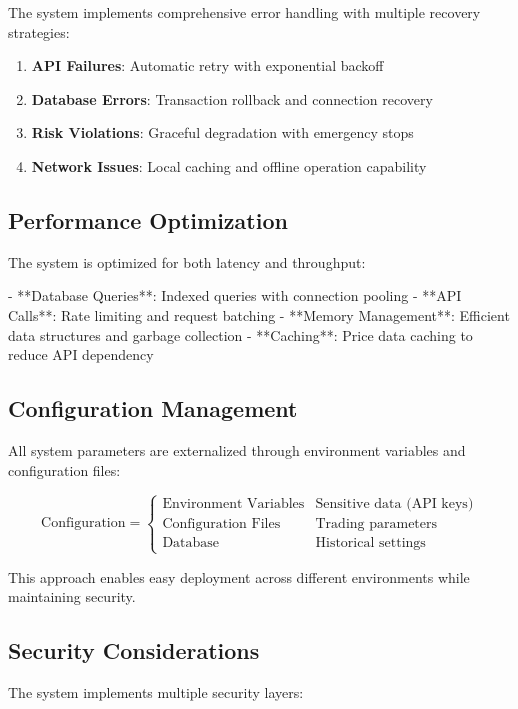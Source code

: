 \documentclass[12pt,a4paper]{article}
\begin{document}
The system implements comprehensive error handling with multiple recovery strategies:

\begin{enumerate}
\item \textbf{API Failures}: Automatic retry with exponential backoff
\item \textbf{Database Errors}: Transaction rollback and connection recovery
\item \textbf{Risk Violations}: Graceful degradation with emergency stops
\item \textbf{Network Issues}: Local caching and offline operation capability
\end{enumerate}

\subsection{Performance Optimization}

The system is optimized for both latency and throughput:

- **Database Queries**: Indexed queries with connection pooling
- **API Calls**: Rate limiting and request batching
- **Memory Management**: Efficient data structures and garbage collection
- **Caching**: Price data caching to reduce API dependency

\subsection{Configuration Management}

All system parameters are externalized through environment variables and configuration files:

\[
\text{Configuration} = \begin{cases}
\text{Environment Variables} & \text{Sensitive data (API keys)} \\
\text{Configuration Files} & \text{Trading parameters} \\
\text{Database} & \text{Historical settings}
\end{cases}
\]

This approach enables easy deployment across different environments while maintaining security.

\subsection{Security Considerations}

The system implements multiple security layers:
\end{document}
